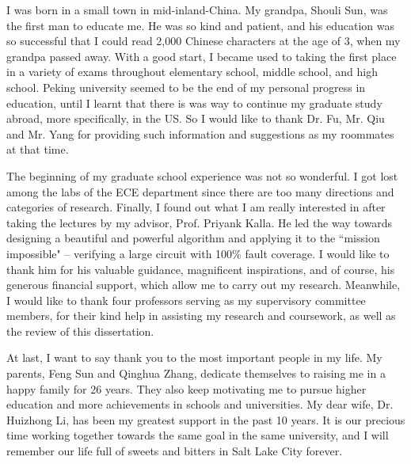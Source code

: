 ﻿I was born in a small town in mid-inland-China. My grandpa, Shouli Sun, 
was the first man to educate me. He was so kind and patient, and his education 
was so successful that I could read 2,000 Chinese characters at the age of 3, 
when my grandpa passed away. With a good start, I became used to taking the 
first place in a variety of exams throughout elementary school, middle school, 
and high school. Peking university seemed to be the end of my personal 
progress in education, until I learnt that there is was way to continue my 
graduate study abroad, more specifically, in the US. So I would like to 
thank Dr. Fu, Mr. Qiu and Mr. Yang for providing such information and 
suggestions as my roommates at that time.

The beginning of my graduate school experience was not 
so wonderful. I got lost among the labs of the ECE department since there are 
too many directions and categories of research. Finally, I found out what
I am really interested in after taking the lectures by my advisor, 
Prof. Priyank Kalla. He led the way towards designing a beautiful and powerful
algorithm and applying it to the ``mission impossible" -- verifying
a large circuit with 100\% fault coverage. I would like to thank him for
his valuable guidance, magnificent inspirations, and of course, his generous 
financial support, which allow me to carry out my research. Meanwhile, I would 
like to thank four professors serving as my supervisory committee members, 
for their kind help in assisting my research and coursework, as well as the 
review of this dissertation.

At last, I want to say thank you to the most important people in my life.
My parents, Feng Sun and Qinghua Zhang, dedicate themselves to raising me
in a happy family for 26 years. They also keep motivating me to pursue higher 
education and more achievements in schools and universities. My dear wife,
Dr. Huizhong Li, has been my greatest support in the past 10 years. It is our 
precious time working together towards the same goal in the same university, and 
I will remember our life full of sweets and bitters in Salt Lake
City forever.
